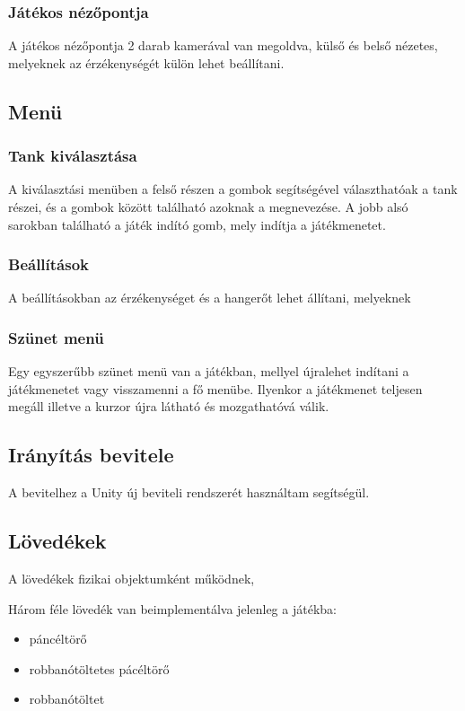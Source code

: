 \documentclass[
]{thesis-ekf}
\theoremstyle{definition}
\theoremstyle{remark}
\begin{document}
\subsubsection{Játékos nézőpontja}

A játékos nézőpontja 2 darab kamerával van megoldva, külső és belső nézetes, melyeknek az érzékenységét külön lehet beállítani.

\subsection{Menü}


\subsubsection{Tank kiválasztása}

A kiválasztási menüben a felső részen a gombok segítségével választhatóak a tank részei, és a gombok között található azoknak a megnevezése. A jobb alsó sarokban található a játék indító gomb, mely indítja a játékmenetet.

\subsubsection{Beállítások}

A beállításokban az érzékenységet és a hangerőt lehet állítani, melyeknek

\subsubsection{Szünet menü}

Egy egyszerűbb szünet menü van a játékban, mellyel újralehet indítani a játékmenetet vagy visszamenni a fő menübe. Ilyenkor a játékmenet teljesen megáll illetve a kurzor újra látható és mozgathatóvá válik.

\subsection{Irányítás bevitele}

A bevitelhez a Unity új beviteli rendszerét használtam segítségül.


\subsection{Lövedékek}

A lövedékek fizikai objektumként működnek,

Három féle lövedék van beimplementálva jelenleg a játékba:
\begin{itemize}
    \item páncéltörő
    \item robbanótöltetes pácéltörő
    \item robbanótöltet
\end{itemize}
\end{document}
